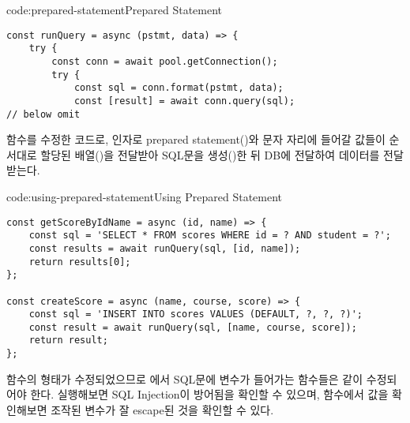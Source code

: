 \begin{codeenv}{code:prepared-statement}{Prepared Statement}\begin{verbatim}
const runQuery = async (pstmt, data) => {
    try {
        const conn = await pool.getConnection();
        try {
            const sql = conn.format(pstmt, data);
            const [result] = await conn.query(sql);
// below omit
\end{verbatim}
\end{codeenv}

\는  함수를 수정한 코드로, 인자로 prepared statement()와  문자 자리에 들어갈 값들이 순서대로 할당된 배열()을 전달받아 SQL문을 생성()한 뒤 DB에 전달하여 데이터를 전달받는다.

\begin{codeenv}{code:using-prepared-statement}{Using Prepared Statement}\begin{verbatim}
const getScoreByIdName = async (id, name) => {
    const sql = 'SELECT * FROM scores WHERE id = ? AND student = ?';
    const results = await runQuery(sql, [id, name]);
    return results[0];
};

const createScore = async (name, course, score) => {
    const sql = 'INSERT INTO scores VALUES (DEFAULT, ?, ?, ?)';
    const result = await runQuery(sql, [name, course, score]);
    return result;
};
\end{verbatim}
\end{codeenv}

 함수의 형태가 수정되었으므로 에서 SQL문에 변수가 들어가는 함수들은 \와 같이 수정되어야 한다. \과 \을 실행해보면 SQL Injection이 방어됨을 확인할 수 있으며,  함수에서  값을 확인해보면 조작된 변수가 잘 escape된 것을 확인할 수 있다.
